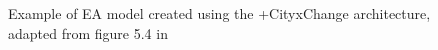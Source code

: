 \begin{figure}
    \centering
    
    \caption{Example of EA model created using the +CityxChange architecture, adapted from figure 5.4 in \cite{cityxchange-d1.2}}
    \label{fig:4-architecture-example}
\end{figure}
